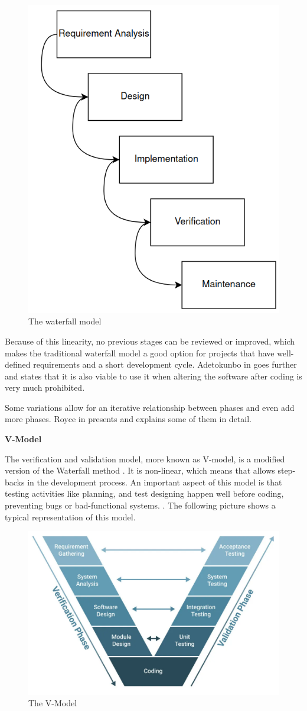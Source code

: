 \begin{figure}[H]
	\centering
 	\includegraphics[width=0.4\linewidth]{Images/Waterfall.png}
 	\caption{The waterfall model}
	 \label{fig_Waterfall}
\end{figure}

Because of this linearity, no previous stages can be reviewed or improved, which makes the traditional waterfall model a good option for projects 
that have well-defined requirements and a short development cycle. Adetokunbo in \cite{waterfallModel} goes further and states that it is also 
viable to use it when altering the software after coding is very much prohibited.

Some variations allow for an iterative relationship between phases and even add more phases. Royce in \cite{royce1970winston} presents and 
explains some of them in detail. 
\newline

\textbf{V-Model}
\newline

The verification and validation model, more known as V-model, is a modified version of the Waterfall method \cite{V-model}. It is non-linear, 
which means that allows step-backs in the development process. An important aspect of this model is that testing activities like planning, and 
test designing happen well before coding, preventing bugs or bad-functional systems. \cite{V-model2}. The following picture shows a typical 
representation of this model.

\begin{figure}[H]
	\centering
 	\includegraphics[width=0.5\linewidth]{Images/V-Model.png}
 	\caption{The V-Model}
	 \label{fig_V-Model}
\end{figure}

